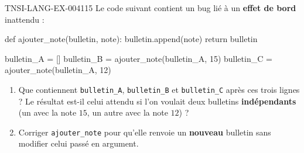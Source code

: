 \begin{exercice}{TNSI-LANG-EX-004}{1}{15}
Le code suivant contient un bug lié à un \textbf{effet de bord} inattendu :
\begin{python}
def ajouter_note(bulletin, note):
    bulletin.append(note)
    return bulletin

bulletin_A = []
bulletin_B = ajouter_note(bulletin_A, 15)
bulletin_C = ajouter_note(bulletin_A, 12)
\end{python}
\begin{enumerate}
  \item Que contiennent \lstinline{bulletin_A}, \lstinline{bulletin_B} et \lstinline{bulletin_C} après ces trois lignes ? Le résultat est-il celui attendu si l'on voulait deux bulletins \textbf{indépendants} (un avec la note $15$, un autre avec la note $12$) ?
  \item Corriger \lstinline{ajouter_note} pour qu'elle renvoie un \textbf{nouveau} bulletin sans modifier celui passé en argument.
\end{enumerate}
\end{exercice}
